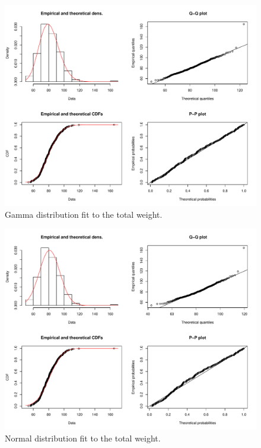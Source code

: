 \documentclass[11pt,american,american]{article}
\begin{document}
\vspace*{\fill}
\begin{figure}[H]
	\centering
	\includegraphics[width=0.8\linewidth]{Images/FIGURES/total_weight_gamma_fitdist}
	\caption{Gamma distribution fit to the total weight.}
	\label{fig:total_weight_gamma_fitdist}
\end{figure}

\begin{figure}[H]
	\centering
	\includegraphics[width=0.8\linewidth]{Images/FIGURES/total_weight_normal_fitdist}
	\caption{Normal distribution fit to the total weight.}
	\label{fig:total_weight_normal_fitdist}
\end{figure}
\vspace*{\fill}

%
\end{document}
